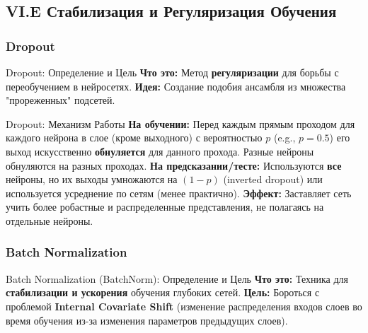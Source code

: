 \subsection{VI.E Стабилизация и Регуляризация Обучения}

\subsubsection{Dropout}
\begin{myexampleblock}{Dropout: Определение и Цель}
    \textbf{Что это:} Метод \textbf{регуляризации} для борьбы с переобучением в нейросетях.
    \textbf{Идея:} Создание подобия ансамбля из множества "прореженных" подсетей.
\end{myexampleblock}

\begin{myexampleblock}{Dropout: Механизм Работы}
    \textbf{На обучении:} Перед каждым прямым проходом для каждого нейрона в слое (кроме выходного) с вероятностью $p$ (e.g., $p=0.5$) его выход искусственно \textbf{обнуляется} для данного прохода. Разные нейроны обнуляются на разных проходах.
    \textbf{На предсказании/тесте:} Используются \textbf{все} нейроны, но их выходы умножаются на $(1-p)$ (inverted dropout) или используется усреднение по сетям (менее практично).
    \textbf{Эффект:} Заставляет сеть учить более робастные и распределенные представления, не полагаясь на отдельные нейроны.
\end{myexampleblock}

\subsubsection{Batch Normalization}
\begin{myexampleblock}{Batch Normalization (BatchNorm): Определение и Цель}
    \textbf{Что это:} Техника для \textbf{стабилизации и ускорения} обучения глубоких сетей.
    \textbf{Цель:} Бороться с проблемой \textbf{Internal Covariate Shift} (изменение распределения входов слоев во время обучения из-за изменения параметров предыдущих слоев).
\end{myexampleblock}

